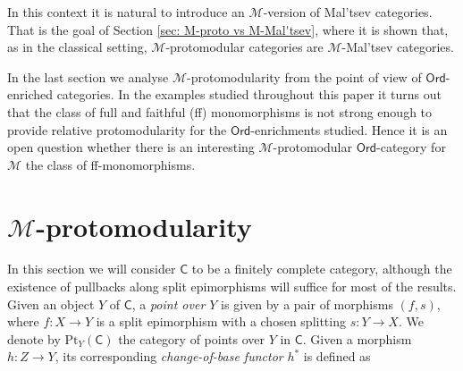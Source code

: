 \documentclass[11pt]{amsart}
\theoremstyle{plain}
\theoremstyle{definition}
\theoremstyle{remark}
\newcommand{\C}{\ensuremath{\mathsf{C}}}
\newcommand{\Ord}{\ensuremath{\mathsf{Ord}}}
\newcommand{\Pt}{\ensuremath{\mathrm{Pt}}}
\newcommand{\M}{\ensuremath{\mathscr{M}}}
\begin{document}
In this context it is natural to introduce an $\M$-version of Mal'tsev categories. That is the goal of Section \ref{sec: M-proto vs M-Mal'tsev}, where it is shown that, as in the classical setting, $\M$-protomodular categories are $\M$-Mal'tsev categories.

In the last section we analyse $\M$-protomodularity from the point of view of $\Ord$-enriched categories. In the examples studied throughout this paper it turns out that the class of full and faithful (ff) monomorphisms is not strong enough to provide relative protomodularity for the $\Ord$-enrichments studied. Hence it is an open question whether there is an interesting $\M$-protomodular $\Ord$-category for $\M$ the class of ff-monomorphisms.



\section{$\M$-protomodularity}\label{sec: M-protomodularity}

In this section we will consider $\C$ to be a finitely complete category, although the existence of pullbacks along split epimorphisms will suffice for most of the results. Given an object $Y$ of $\C$, a \emph{point over $Y$} is given by a pair of morphisms $(f,s)$, where $f\colon X\to Y$ is a split epimorphism with a chosen splitting $s\colon Y\to X$. We denote by $\Pt_Y(\C)$ the category of points over $Y$ in $\C$. Given a morphism $h\colon Z\to Y$, its corresponding \emph{change-of-base functor} $h^*$ is defined as
\end{document}
